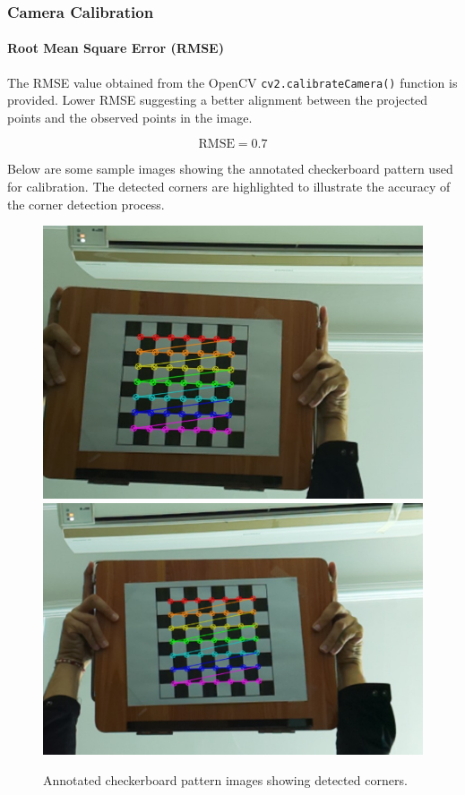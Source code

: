 \subsubsection{Camera Calibration}

\paragraph{Root Mean Square Error (RMSE)}
The RMSE value obtained from the OpenCV \texttt{cv2.calibrateCamera()} function is provided. Lower RMSE suggesting a better alignment between the projected points and the observed points in the image.

\begin{equation}
	\text{RMSE} = 0.7
\end{equation}

Below are some sample images showing the annotated checkerboard pattern used for calibration. The detected corners are highlighted to illustrate the accuracy of the corner detection process.

\begin{figure}[h!]
	\centering
	\includegraphics[height=0.2\textheight]{images/checkerboardL.jpeg}
	\includegraphics[height=0.2\textheight]{images/checkerboardR.jpeg}
	\caption{Annotated checkerboard pattern images showing detected corners.}
\end{figure}

